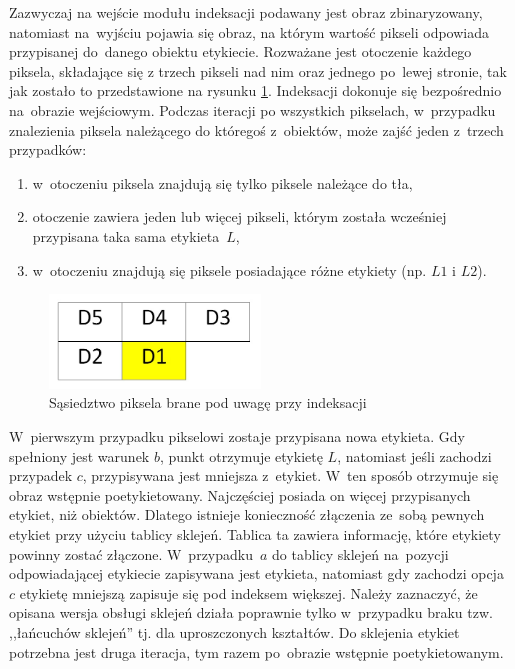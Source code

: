 Zazwyczaj na wejście modułu indeksacji podawany jest obraz zbinaryzowany, natomiast na~wyjściu pojawia się obraz, na którym  wartość  pikseli odpowiada przypisanej do~danego obiektu etykiecie. 
Rozważane jest otoczenie każdego piksela, składające się z trzech pikseli nad nim oraz jednego po~lewej stronie, tak jak zostało to przedstawione na rysunku \ref{fig:ind_sasiedztwo}. 
Indeksacji dokonuje się bezpośrednio na~obrazie wejściowym. 
Podczas iteracji po wszystkich pikselach, w~przypadku znalezienia piksela należącego do któregoś z~obiektów, może zajść jeden z~trzech przypadków:
\begin{enumerate}[label=(\alph*)]
	\item w~otoczeniu piksela znajdują się tylko piksele należące do tła,
	\item otoczenie zawiera jeden lub więcej pikseli, którym została wcześniej przypisana taka sama etykieta~$L$,
	\item w~otoczeniu znajdują się piksele posiadające różne etykiety (np. $L1$ i $L2$).
\end{enumerate} 
\begin{figure}[h]
	\centering
	\includegraphics[width=0.5\textwidth]{ind_sasiedztwo.jpg}
	\caption{Sąsiedztwo piksela brane pod uwagę przy indeksacji}
	\label{fig:ind_sasiedztwo}
\end{figure}

W~pierwszym przypadku pikselowi zostaje przypisana nowa etykieta. 
Gdy spełniony jest warunek $b$, punkt otrzymuje etykietę $L$, natomiast jeśli zachodzi przypadek $c$, przypisywana jest mniejsza z~etykiet. 
W~ten sposób otrzymuje się obraz wstępnie poetykietowany. 
Najczęściej posiada on więcej przypisanych etykiet, niż obiektów. 
Dlatego istnieje konieczność złączenia ze~sobą pewnych etykiet przy użyciu tablicy sklejeń. 
Tablica ta zawiera informację, które etykiety powinny zostać złączone. 
W~przypadku~$a$ do tablicy sklejeń na~pozycji odpowiadającej etykiecie zapisywana jest etykieta, natomiast gdy zachodzi opcja~$c$ etykietę mniejszą zapisuje się pod indeksem większej. 
Należy zaznaczyć, że opisana wersja obsługi sklejeń działa poprawnie tylko w~przypadku braku tzw. ,,łańcuchów sklejeń'' tj. dla uproszczonych kształtów. 
Do sklejenia etykiet potrzebna jest druga iteracja, tym razem po~obrazie wstępnie poetykietowanym.

